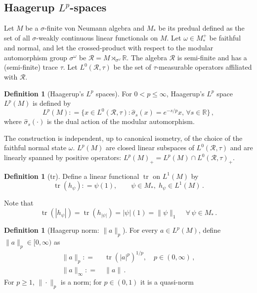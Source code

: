 \documentclass[11pt,a4paper]{article}
\theoremstyle{plain}
\numberwithin{theorem}{section}
\theoremstyle{definition}
\newtheorem{definition}[theorem]{Definition}
\newcommand{\?}{\overset{?}{=}}
\newcommand{\defeq}{\mathrel{\mathop:}=}
\DeclareMathOperator{\tr}{tr}
\newcommand{\A}{\,\forall\,}
\newcommand{\I}{\infty}
\renewcommand{\t}{\tau}		%
\begin{document}
\subsection{Haagerup \texorpdfstring{$L^p$}{Lp}-spaces}
\label{subsec:Haagerup-Lp}

Let $M$ be a $\sigma$-finite von Neumann algebra and $M_*$ be its predual  defined as the set of all $\sigma$-weakly continuous linear functionals on $M$. 
Let $\omega\in M_*^+$ be faithful and normal, and let the crossed-product with respect to the modular automorphism group $\sigma^{\omega}$ be $\mathcal R= M\rtimes_{\sigma^\omega} \mathbb{R} $. The algebra $\mathcal R$ is semi-finite and has a (semi-finite) trace $\tau$. Let $L^0(\mathcal R,\t)$ be the set of $\tau$-measurable operators affiliated with $\mathcal R$. 
\begin{definition}[Haagerup's $L^p$ spaces]\label{def:Haagerup-space}
For $0<p\leq \I$, Haagerup's $L^p$ space $L^p(M)$ is defined by
\begin{equation}
    L^p(M)\defeq\{x\in  L^0(\mathcal R,\t): \hat{\sigma}_s(x)=e^{-s/p}x,\, \forall s\in \mathbb{R}\}\,,
\end{equation}
where $\hat{\sigma}_s(\cdot)$ is the dual action of the modular automorphism.
\end{definition}
The construction is independent, up to canonical isometry, of the choice
of the faithful normal state \(\omega\).
$L^p(M)$ are closed linear subspaces of $ L^0(\mathcal R,\t)$ and are linearly spanned by positive operators: $L^p(M)_+ = L^p(M)\cap L^0(\mathcal R,\t)_+$. 

\begin{definition}[tr]
Define a linear functional ${\tr}$ on $L^1(M)$ by
\begin{equation}
    {\tr}(h_\psi)\defeq\psi(1),\qquad \psi\in M_*, \; h_\psi \in L^1(M)\,.
\end{equation}
\end{definition}
Note that
\begin{equation}
   {\tr}(|h_\psi|)=\tr(h_{|\psi|}) = |\psi|(1)=\|\psi\|_1 \quad\A\psi\in M_*\,.
\end{equation}
\begin{definition}[Haagerup norm: $\|a\|_p$]\label{def:haagerup-norm}
For every $a\in L^p(M)$, define $\|a\|_p \in [0,\I)$ as
\begin{align}
    \|a\|_p \defeq&\ {\tr}(|a|^p)^{1/p}, \quad p\in(0,\I)\,,\\
    \|a\|_\I \defeq&\ \|a\|\,.
\end{align}
For $p\geq1$, $\|\cdot\|_p$ is a norm; for $p\in(0,1)$ it is a quasi-norm
\end{definition}
\end{document}
